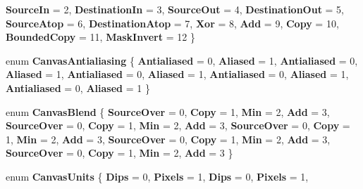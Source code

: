 \begin{DoxyCompactItemize}
{\bfseries Source\+In} = 2, 
{\bfseries Destination\+In} = 3, 
\newline
{\bfseries Source\+Out} = 4, 
{\bfseries Destination\+Out} = 5, 
{\bfseries Source\+Atop} = 6, 
{\bfseries Destination\+Atop} = 7, 
\newline
{\bfseries Xor} = 8, 
{\bfseries Add} = 9, 
{\bfseries Copy} = 10, 
{\bfseries Bounded\+Copy} = 11, 
\newline
{\bfseries Mask\+Invert} = 12
 \}
\item 
\mbox{\label{namespace_microsoft_1_1_graphics_1_1_canvas_a3ca0365f7ca6c805554d000be051da7c}} 
enum {\bfseries Canvas\+Antialiasing} \{ \newline
{\bfseries Antialiased} = 0, 
{\bfseries Aliased} = 1, 
{\bfseries Antialiased} = 0, 
{\bfseries Aliased} = 1, 
\newline
{\bfseries Antialiased} = 0, 
{\bfseries Aliased} = 1, 
{\bfseries Antialiased} = 0, 
{\bfseries Aliased} = 1, 
\newline
{\bfseries Antialiased} = 0, 
{\bfseries Aliased} = 1
 \}
\item 
\mbox{\label{namespace_microsoft_1_1_graphics_1_1_canvas_a4d6f8dfcb051c810dfc379d736e689a4}} 
enum {\bfseries Canvas\+Blend} \{ \newline
{\bfseries Source\+Over} = 0, 
{\bfseries Copy} = 1, 
{\bfseries Min} = 2, 
{\bfseries Add} = 3, 
\newline
{\bfseries Source\+Over} = 0, 
{\bfseries Copy} = 1, 
{\bfseries Min} = 2, 
{\bfseries Add} = 3, 
\newline
{\bfseries Source\+Over} = 0, 
{\bfseries Copy} = 1, 
{\bfseries Min} = 2, 
{\bfseries Add} = 3, 
\newline
{\bfseries Source\+Over} = 0, 
{\bfseries Copy} = 1, 
{\bfseries Min} = 2, 
{\bfseries Add} = 3, 
\newline
{\bfseries Source\+Over} = 0, 
{\bfseries Copy} = 1, 
{\bfseries Min} = 2, 
{\bfseries Add} = 3
 \}
\item 
\mbox{\label{namespace_microsoft_1_1_graphics_1_1_canvas_a42a64ab003f060d5bc514b2c0c2f9869}} 
enum {\bfseries Canvas\+Units} \{ \newline
{\bfseries Dips} = 0, 
{\bfseries Pixels} = 1, 
{\bfseries Dips} = 0, 
{\bfseries Pixels} = 1, 
\newline

\end{DoxyCompactItemize}
